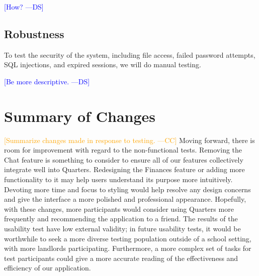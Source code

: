 \documentclass[12pt]{article}
\newcommand{\authornote}[3]{\textcolor{#1}{[#3 ---#2]}}
\newcommand{\authornote}[3]{}
\newcommand{\ds}[1]{\authornote{blue}{DS}{#1}}
\newcommand{\cc}[1]{\authornote{orange}{CC}{#1}}
\begin{document}
\ds{How?}

\subsection{Robustness}
To test the security of the system, including file access, failed password attempts, SQL injections, and expired sessions, we will do manual testing.

\ds{Be more descriptive.}

\section{Summary of Changes}
\cc{Summarize changes made in response to testing.}
Moving forward, there is room for improvement with regard to the non-functional tests. Removing the Chat feature is something to consider to ensure all of our features collectively integrate well into Quarters. Redesigning the Finances feature or adding more functionality to it may help users understand its purpose more intuitively. Devoting more time and focus to styling would help resolve any design concerns and give the interface a more polished and professional appearance. Hopefully, with these changes, more participants would consider using Quarters more frequently and recommending the application to a friend. The results of the usability test have low external validity; in future usability tests, it would be worthwhile to seek a more diverse testing population outside of a school setting, with more landlords participating. Furthermore, a more complex set of tasks for test participants could give a more accurate reading of the effectiveness and efficiency of our application.
\end{document}
